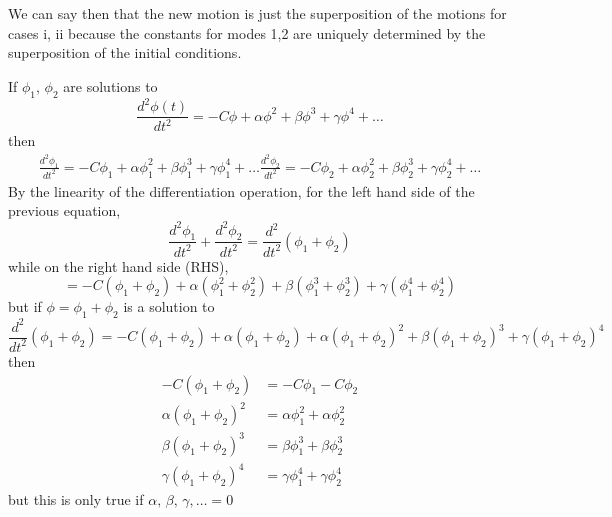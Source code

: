 \documentclass[twoside,10pt]{amsart}
\newcommand{\problemhead}[1]
  {\smallskip
   \noindent{\large\bf Problem #1.}
   \smallskip}
\begin{document}
We can say then that the new motion is just the superposition of the motions for cases i, ii because the constants for modes 1,2 are uniquely determined by the superposition of the initial conditions.  

\problemhead{1.16} If $\phi_1, \, \phi_2$ are solutions to
\[
\frac{d^2 \phi(t)}{ dt^2}  = -C \phi + \alpha \phi^2 + \beta \phi^3 + \gamma \phi^4 + \dots
\]
then
\[
\begin{aligned}
  \frac{d^2 \phi_1}{ dt^2 } = -C \phi_1 + \alpha \phi_1^2 + \beta \phi_1^3 + \gamma \phi_1^4 + \dots
  \frac{d^2 \phi_2}{ dt^2 } = -C \phi_2 + \alpha \phi_2^2 + \beta \phi_2^3 + \gamma \phi_2^4 + \dots
\end{aligned}
\]
By the linearity of the differentiation operation, for the left hand side of the previous equation,
\[
\frac{d^2 \phi_1}{dt^2} + \frac{d^2 \phi_2}{dt^2}  =\frac{d^2}{dt^2} (\phi_1 + \phi_2)
\]
while on the right hand side (RHS), 
\[
=-C(\phi_1 + \phi_2) + \alpha (\phi_1^2 + \phi_2^2 ) + \beta (\phi_1^3 + \phi_2^3 ) + \gamma (\phi_1^4 + \phi_2^4)
\]
but if $\phi = \phi_1 + \phi_2$ is a solution to \[
\frac{d^2}{dt^2} (\phi_1 + \phi_2) = -C (\phi_1 + \phi_2) + \alpha(\phi_1 + \phi_2) + \alpha(\phi_1 + \phi_2)^2 + \beta(\phi_1 + \phi_2)^3 + \gamma (\phi_1 + \phi_2)^4
\]
then 
\[
\begin{aligned}
  -C(\phi_1 +\phi_2) & = -C \phi_1 - C \phi_2 \\
  \alpha (\phi_1 + \phi_2)^2 & = \alpha \phi_1^2 + \alpha \phi_2^2 \\
  \beta ( \phi_1 + \phi_2)^3 & = \beta \phi_1^3 + \beta \phi_2^3 \\
  \gamma (\phi_1+\phi_2)^4 & = \gamma \phi_1^4 + \gamma \phi_2^4
\end{aligned}
\]
but this is only true if $\alpha, \, \beta, \, \gamma, \dots = 0 $  
\end{document}
